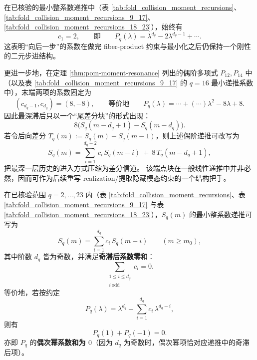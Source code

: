




\begin{remark}\label{rem:pom-recurrence-endpoint-rigidity}
在已核验的最小整系数递推中（表 \ref{tab:fold_collision_moment_recursions}、\ref{tab:fold_collision_moment_recursions_9_17}、\ref{tab:fold_collision_moment_recursions_18_23}），始终有
\[
c_1=2,
\qquad\text{即}\qquad
P_q(\lambda)=\lambda^{d_q}-2\lambda^{d_q-1}+\cdots.
\]
这表明“向后一步”的系数在做完 fiber-product 约束与最小化之后仍保持一个刚性的二元步进结构。
\par
更进一步地，在定理 \ref{thm:pom-moment-resonance} 列出的偶阶多项式 \(P_{12},P_{14}\) 中（以及表 \ref{tab:fold_collision_moment_recursions_9_17} 的 \(q=16\) 最小递推系数中），末端两项的系数固定为
\[
(c_{d_q-1},c_{d_q})=(8,-8),
\qquad\text{等价地}\qquad
P_q(\lambda)=\cdots+(\cdots)\lambda^2-8\lambda+8.
\]
因此最深滞后只以一个“尾差分块”的形式出现：
\[
8\bigl(S_q(m-d_q+1)-S_q(m-d_q)\bigr).
\]
若令后向差分 \(T_q(m):=S_q(m)-S_q(m-1)\)，则上述偶阶递推可改写为
\[
S_q(m)=\sum_{i=1}^{d_q-2}c_i\,S_q(m-i)\ +\ 8\,T_q(m-d_q+1),
\]
把最深一层历史的进入方式压缩为差分信道。
该端点块在一般线性递推中并非必然，因而可作为后续重写 realization/提取隐藏模态约束的一个结构把手。
\end{remark}

\begin{proposition}\label{prop:pom-moment-odd-lag-neutrality}
在已核验范围 \(q=2,\dots,23\) 内（表 \ref{tab:fold_collision_moment_recursions}、表 \ref{tab:fold_collision_moment_recursions_9_17} 与表 \ref{tab:fold_collision_moment_recursions_18_23}），\(S_q(m)\) 的最小整系数递推可写为
\[
S_q(m)=\sum_{i=1}^{d_q} c_i\,S_q(m-i)\qquad(m\ge m_0),
\]
其中阶数 \(d_q\) 皆为奇数，并满足\textbf{奇滞后系数零和}：
\[
\sum_{\substack{1\le i\le d_q\\ i\ \mathrm{odd}}} c_i=0.
\]
等价地，若按约定
\[
P_q(\lambda)=\lambda^{d_q}-\sum_{i=1}^{d_q}c_i\,\lambda^{d_q-i},
\]
则有
\[
P_q(1)+P_q(-1)=0.
\]
亦即 \(P_q\) 的\textbf{偶次幂系数和为 \(0\)}（因为 \(d_q\) 为奇数时，偶次幂项恰对应递推中的奇滞后项）。
\end{proposition}

